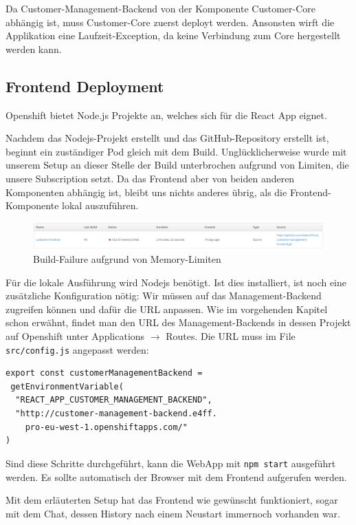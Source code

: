 \documentclass[12pt,a4paper]{article}
\begin{document}
Da Customer-Management-Backend von der Komponente Customer-Core abhängig ist, muss Customer-Core zuerst deployt werden. Ansonsten wirft die Applikation eine Laufzeit-Exception, da keine Verbindung zum Core hergestellt werden kann. 

\subsection{Frontend Deployment}\label{subsec:frontend}
Openshift bietet Node.js Projekte an, welches sich für die React App eignet. 

Nachdem das Nodejs-Projekt erstellt und das GitHub-Repository erstellt ist, beginnt ein zuständiger Pod gleich mit dem Build. Unglücklicherweise wurde mit unserem Setup an dieser Stelle der Build unterbrochen aufgrund von Limiten, die unsere Subscription setzt. Da das Frontend aber von beiden anderen Komponenten abhängig ist, bleibt uns nichts anderes übrig, als die Frontend-Komponente lokal auszuführen. 

\begin{figure}[h]
	\centering
	\includegraphics[width=1\linewidth]{img/os-frontend-build-fail}
	\caption{Build-Failure aufgrund von Memory-Limiten}
	\label{fig:os-frontend-build-fail}
\end{figure}

Für die lokale Ausführung wird Nodejs benötigt. Ist dies installiert, ist noch eine zusätzliche Konfiguration nötig: Wir müssen auf das Management-Backend zugreifen können und dafür die URL anpassen. Wie im vorgehenden Kapitel schon erwähnt, findet man den URL des Management-Backends in dessen Projekt auf Openshift unter Applications $\rightarrow$ Routes. Die URL muss im File \texttt{src/config.js} angepasst werden:
\begin{lstlisting}[showstringspaces=false]
export const customerManagementBackend =
 getEnvironmentVariable(
  "REACT_APP_CUSTOMER_MANAGEMENT_BACKEND",
  "http://customer-management-backend.e4ff.
    pro-eu-west-1.openshiftapps.com/"
)
\end{lstlisting}
Sind diese Schritte durchgeführt, kann die WebApp mit \texttt{npm start} ausgeführt werden. Es sollte automatisch der Browser mit dem Frontend aufgerufen werden. 

Mit dem erläuterten Setup hat das Frontend wie gewünscht funktioniert, sogar mit dem Chat, dessen History nach einem Neustart immernoch vorhanden war. 
\end{document}
